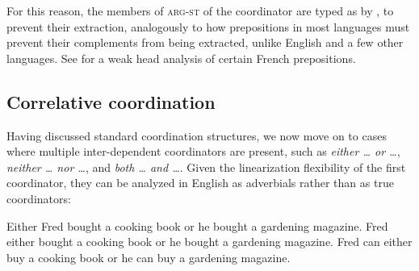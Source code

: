 \documentclass[output=paper]{langsci/langscibook}
\begin{document}

\begin{exe}
\end{exe}\label{cc}




\noindent
For this reason, the members of \textsc{arg-st} of the coordinator are typed as  by \citet{Abeille:03}, to prevent their extraction, analogously to how prepositions in most languages must prevent their complements from being extracted, unlike English and a few other languages.
See \citet{Abeille:06} for a weak head analysis of certain French prepositions.




\subsection{Correlative coordination}\label{correlphr}


Having discussed standard coordination structures, we now move on to cases where
multiple inter-dependent coordinators are present, such as \emph{either \ldots{} or \ldots{}},
\emph{neither \ldots{} nor \ldots{}}, 
and \emph{both \ldots{} and \ldots{}}. Given the linearization flexibility of the first coordinator, they  can be analyzed in English as adverbials rather than as true coordinators:

\begin{exe}
 \ex
\begin{xlista}
\ex  Either Fred bought a cooking book or he bought a gardening magazine.
\ex  Fred either bought a cooking book or he bought a gardening magazine.
\ex  Fred can either buy a cooking book or he can buy a gardening magazine.
\end{xlista}
\end{exe}
\end{document}
